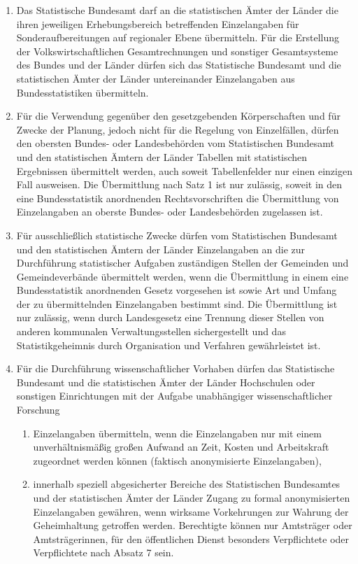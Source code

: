 \documentclass[A4, 12pt]{scrbook}
\begin{document}
\begin{enumerate}[label=(\arabic*)]
            \item Das Statistische Bundesamt darf an die statistischen Ämter der Länder die ihren jeweiligen Erhebungsbereich betreffenden Einzelangaben für Sonderaufbereitungen auf regionaler Ebene übermitteln. Für die Erstellung der Volkswirtschaftlichen Gesamtrechnungen und sonstiger Gesamtsysteme des Bundes und der Länder dürfen sich das Statistische Bundesamt und die statistischen Ämter der Länder untereinander Einzelangaben aus Bundesstatistiken übermitteln.
            \item Für die Verwendung gegenüber den gesetzgebenden Körperschaften und für Zwecke der Planung, jedoch nicht für die Regelung von Einzelfällen, dürfen den obersten Bundes- oder Landesbehörden vom Statistischen Bundesamt und den statistischen Ämtern der Länder Tabellen mit statistischen Ergebnissen übermittelt werden, auch soweit Tabellenfelder nur einen einzigen Fall ausweisen. Die Übermittlung nach Satz 1 ist nur zulässig, soweit in den eine Bundesstatistik anordnenden Rechtsvorschriften die Übermittlung von Einzelangaben an oberste Bundes- oder Landesbehörden zugelassen ist.
            \item Für ausschließlich statistische Zwecke dürfen vom Statistischen Bundesamt und den statistischen Ämtern der Länder Einzelangaben an die zur Durchführung statistischer Aufgaben zuständigen Stellen der Gemeinden und Gemeindeverbände übermittelt werden, wenn die Übermittlung in einem eine Bundesstatistik anordnenden Gesetz vorgesehen ist sowie Art und Umfang der zu übermittelnden Einzelangaben bestimmt sind. Die Übermittlung ist nur zulässig, wenn durch Landesgesetz eine Trennung dieser Stellen von anderen kommunalen Verwaltungsstellen sichergestellt und das Statistikgeheimnis durch Organisation und Verfahren gewährleistet ist. 
            \item Für die Durchführung wissenschaftlicher Vorhaben dürfen das Statistische Bundesamt und die statistischen Ämter der Länder Hochschulen oder sonstigen Einrichtungen mit der Aufgabe unabhängiger wissenschaftlicher Forschung
                \begin{enumerate}[label=\arabic*.]
                    \item Einzelangaben übermitteln, wenn die Einzelangaben nur mit einem unverhältnismäßig großen Aufwand an Zeit, Kosten und Arbeitskraft zugeordnet werden können (faktisch anonymisierte Einzelangaben),
                    \item innerhalb speziell abgesicherter Bereiche des Statistischen Bundesamtes und der statistischen Ämter der Länder Zugang zu formal anonymisierten Einzelangaben gewähren, wenn wirksame Vorkehrungen zur Wahrung der Geheimhaltung getroffen werden. Berechtigte können nur Amtsträger oder Amtsträgerinnen, für den öffentlichen Dienst besonders Verpflichtete oder Verpflichtete nach Absatz 7 sein.

\end{enumerate}
\end{enumerate}
\end{document}
